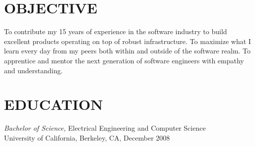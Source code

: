 \documentclass[overlapped,line,margin]{res}
\begin{document}
\address{
   Queens, NY, USA
   +1 (510) 646-0724
   \href{https://github.com/joshk0}{joshk0}
   \href{https://linkedin.com/in/joshk0}{joshk0}
   last updated \href{https://circleci.com/gh/joshk0/resume}{\today}
}

\begin{resume}

\section{OBJECTIVE}
To contribute my 15 years of experience in the software industry to
build excellent products operating on top of robust infrastructure.
To maximize what I learn every day from my peers both within and outside
of the software realm.
To apprentice and mentor the next generation of software engineers with
empathy and understanding.

\section{EDUCATION} \textit{Bachelor of Science,} Electrical Engineering and Computer Science \\
  University of California, Berkeley, CA, December 2008


\end{resume}
\end{document}
